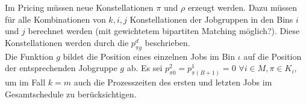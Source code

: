\documentclass{article}
\begin{document}
Im Pricing müssen neue Konstellationen $\pi$ und $\rho$ erzeugt werden.
Dazu müssen für alle Kombinationen von $k,i,j$ Konstellationen der Jobgruppen in den Bins $i$ und $j$ berechnet werden 
(mit gewichtetem bipartiten Matching möglich?).
Diese Konstellationen werden durch die $p_{\pi g}^d$ beschrieben.
\\
Die Funktion $g$ bildet die Position eines einzelnen Jobs im Bin $\iota$ auf die Position der entsprechenden Jobgruppe $g$ ab.
Es sei $p_{\pi 0}^2 = p_{\pi (B+1)}^1 = 0$ $\forall i\in M, \pi\in K_i$, um im Fall $k=m$ auch die Prozesszeiten des ersten
und letzten Jobs im Gesamtschedule zu berücksichtigen.
\end{document}

